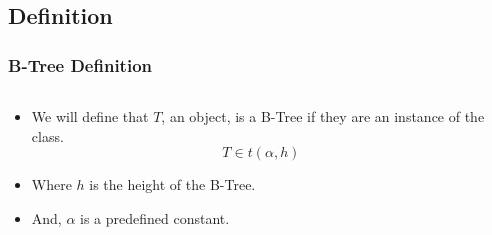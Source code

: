 \documentclass{beamer}
\begin{document}
\begin{frame}
    \subsection{Definition}
    \frametitle{B-Tree Definition}
    \begin{columns}
        \begin{column}{\textlecolumn}
            \begin{block}{}
                \begin{itemize}
                    \item We will define that \(T\), an object, is a B-Tree if they are an instance of the class.
                    \[
                        T \in t\left(\alpha, h\right)
                    \]
                    \item Where \(h\) is the height of the B-Tree.
                    \item And, \(\alpha\) is a predefined constant.
                \end{itemize}
            \end{block}
        \end{column}
        \begin{column}{\textricolumn}
        \end{column}
    \end{columns}
\end{frame}
\end{document}
